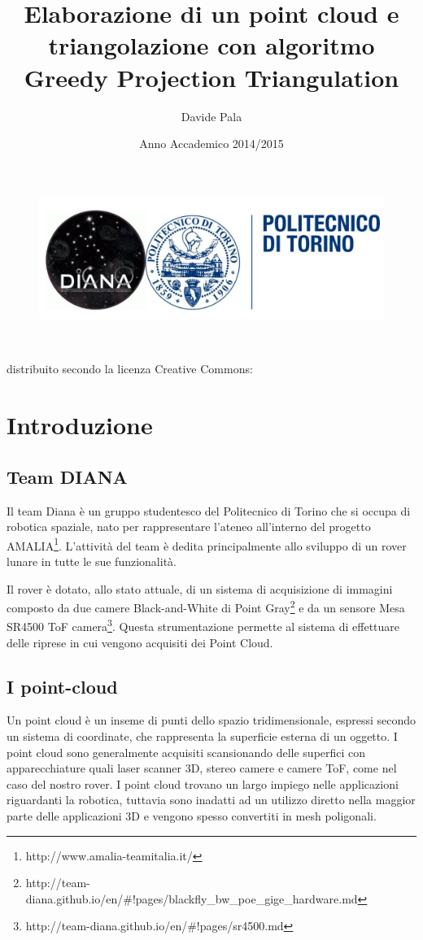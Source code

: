 \documentclass[a4paper,12pt]{article}
\title{Elaborazione di un point cloud e triangolazione con algoritmo Greedy Projection Triangulation}
\author{Davide Pala}
\date{Anno Accademico 2014/2015}
\begin{document}
\maketitle
\begin{figure}[H]
\centering
\includegraphics[width=13cm]{pics/logo_diana.jpg}
\end{figure}
\
\
\
\begin{center}
\small{distribuito secondo la licenza Creative Commons: \ccbyncsa}
\end{center}

\clearpage
\tableofcontents
\clearpage
\section{Introduzione}
	\subsection{Team DIANA}
	Il team Diana è un gruppo studentesco del Politecnico di Torino che si occupa di
	robotica spaziale, nato per rappresentare l'ateneo all'interno del progetto 
	AMALIA\footnote{http://www.amalia-teamitalia.it/}. 
	L'attività del team è dedita principalmente allo sviluppo di un rover lunare 
	in tutte le sue funzionalità.
	
	Il rover è dotato, allo stato attuale, di un sistema di acquisizione di immagini 
	composto da due camere Black-and-White di Point 
	Gray\footnote{http://team-diana.github.io/en/\#!pages/blackfly\_bw\_poe\_gige\_hardware.md} 
	e da un sensore Mesa SR4500 ToF	camera\footnote{http://team-diana.github.io/en/\#!pages/sr4500.md}.
	Questa strumentazione permette al sistema di effettuare delle riprese in cui vengono acquisiti dei 
	Point Cloud.
	
	\subsection{I point-cloud}
	Un point cloud è un inseme di punti dello spazio tridimensionale, espressi secondo un sistema di coordinate, 
	che rappresenta la superficie esterna di un oggetto.
	I point cloud sono generalmente acquisiti scansionando delle superfici con apparecchiature quali laser scanner 3D, stereo
	camere e camere ToF, come nel caso del nostro rover. I point cloud trovano un largo impiego nelle applicazioni riguardanti
	la robotica, tuttavia sono inadatti ad un utilizzo diretto nella maggior parte delle applicazioni 3D e vengono spesso
	convertiti in mesh poligonali. 
	\clearpage
\end{document}
